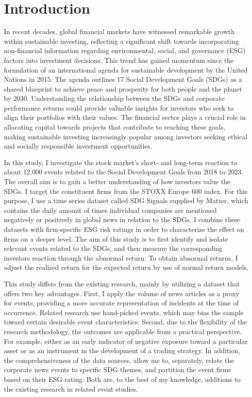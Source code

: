 \section{Introduction} \label{sec:intro}

In recent decades, global financial markets have witnessed remarkable growth within sustainable investing, reflecting a significant shift towards incorporating non-financial information regarding environmental, social, and governance (ESG) factors into investment decisions. This trend has gained momentum since the formulation of an international agenda for sustainable development by the United Nations in 2015. The agenda outlines 17 Social Development Goals (SDGs) as a shared blueprint to achieve peace and prosperity for both people and the planet by 2030. Understanding the relationship between the SDGs and corporate performance returns could provide valuable insights for investors who seek to align their portfolios with their values. The financial sector plays a crucial role in allocating capital towards projects that contribute to reaching these goals, making sustainable investing increasingly popular among investors seeking ethical and socially responsible investment opportunities. 

In this study, I investigate the stock market's short- and long-term reaction to about 12.000 events related to the Social Development Goals from 2018 to 2023. The overall aim is to gain a better understanding of how investors value the SDGs. I target the constituent firms from the STOXX Europe 600 index. For this purpose, I use a time series dataset called SDG Signals supplied by Matter, which contains the daily amount of times individual companies are mentioned negatively or positively in global news in relation to the SDGs. I combine these datasets with firm-specific ESG risk ratings in order to characterize the effect on firms on a deeper level. The aim of this study is to first identify and isolate relevant events related to the SDGs, and then measure the corresponding investors reaction through the abnormal return. To obtain abnormal returns, I adjust the realized return for the expected return by use of normal return models.

This study differs from the existing research, mainly by utilizing a dataset that offers two key advantages. First, I apply  the volume of news articles as a proxy for events, providing a more accurate representation of incidents at the time of occurrence. Related research use hand-picked events, which may bias the sample toward certain desirable event characteristics. Second,  due to the flexibility of the research methodology, the outcomes are applicable from a practical perspective. For example, either as an early indicator of negative exposure toward a particular asset or as an instrument in the development of a trading strategy. In addition, the comprehensiveness of the data sources, allow me to, separately, relate the corporate news events to specific SDG themes, and partition the event firms based on their ESG rating. Both are, to the best of my knowledge, additions to the existing research in related event studies.  


